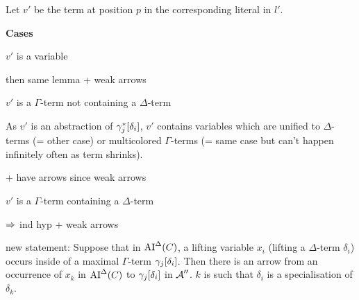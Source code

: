 \documentclass[,%
	paper=a4,%
	DIV14, %
	twoside=false,%
	liststotoc,
	bibtotoc,
	draft=false,%
	numbers=noendperiod
]{scrartcl}
\begin{document}
Let $v'$ be the term at position $p$ in the corresponding literal in $l'$.

\textbf{Cases}
\begin{compactitem}
\item $v'$ is a variable 

	then same lemma + weak arrows

\item $v'$ is a $\Gamma$-term not containing a $\Delta$-term 

	As $v'$ is an abstraction of $\gamma_j^*[\delta_i]$, $v'$ contains variables which are unified to $\Delta$-terms (= other case) or multicolored $\Gamma$-terms (= same case but can't happen infinitely often as term shrinks).

	+ have arrows since weak arrows

\item $v'$ is a $\Gamma$-term containing a $\Delta$-term 

	$\Rightarrow$ ind hyp + weak arrows
\end{compactitem}









new statement:
Suppose that in $\operatorname{AI}^\Delta(C)$, a lifting variable $x_i$ (lifting a $\Delta$-term $\delta_i$)
occurs inside of a maximal $\Gamma$-term $\gamma_j[\delta_i]$.
Then there is an arrow from an occurrence of $x_k$ in $\operatorname{AI}^\Delta(C)$ to $\gamma_j[\delta_i]$ in $\operatorname{\mathcal{A}}''$. $k$ is such that $\delta_i$ is a specialisation of $\delta_k$.
\end{document}
